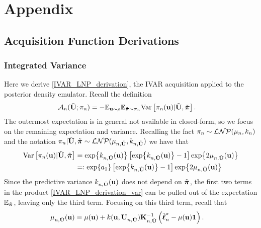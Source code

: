 \documentclass[12pt]{article}
\begin{document}
\section{Appendix}
\subsection{Acquisition Function Derivations}
\subsubsection{Integrated Variance}
Here we derive \ref{IVAR_LNP_derivation}, the IVAR acquisition applied to the posterior density emulator. Recall the definition 
\begin{align}
\acq[\designIdx](\batchMat; \unPostPred) &= -\E_{\bpar \sim \rho} \E_{\tilde{\boldsymbol{\postDens}}  \sim \unPostPred} \Var\left[\unPostPred(\bpar) | \batchMat, \tilde{\boldsymbol{\postDens}} \right].
\end{align}
The outermost expectation is in general not available in closed-form, so we focus on the remaining expectation and variance. Recalling the fact 
$\unPostPred \sim \LNP(\logUnPostMeanPred, \logUnPostKerPred)$ and the notation 
$\unPostPred | \batchMat, \tilde{\boldsymbol{\postDens}} \sim \LNP(\logUnPostMeanPred[\designIdx, \batchMat], \logUnPostKerPred[\designIdx, \batchMat])$
we have that 
\begin{align}
\Var\left[\unPostPred(\bpar) | \batchMat, \tilde{\boldsymbol{\postDens}} \right] &= \Exp{\logUnPostKerPred[\designIdx, \batchMat](\bpar)} \left[\Exp{\logUnPostKerPred[\designIdx, \batchMat](\bpar)} - 1\right] \Exp{2 \logUnPostMeanPred[\designIdx, \batchMat](\bpar)} \label{IVAR_LNP_derivation_var} \\
&=: \Exp{a_1}  \left[\Exp{\logUnPostKerPred[\designIdx, \batchMat](\bpar)} - 1\right] \Exp{2 \logUnPostMeanPred[\designIdx, \batchMat](\bpar)} \nonumber
\end{align}
Since the predictive variance $\logUnPostKerPred[\designIdx, \batchMat](\bpar)$ does not depend on $\tilde{\boldsymbol{\postDens}}$, the first two terms in the 
product \ref{IVAR_LNP_derivation_var} can be pulled out of the expectation $\E_{\tilde{\boldsymbol{\postDens}}}$, leaving only the third term. Focusing on this third term, 
recall that 
\begin{align*}
\logUnPostMeanPred[\designIdx, \batchMat](\bpar) &= \logUnPostMean(\bpar) + \logUnPostKer(\bpar, \designMat[\designIdx, \batchMat]) \KerMat[\designIdx, \batchMat]^{-1} \left(\logUnPostObsBatch - \logUnPostMean(\bpar) \oneVec \right).
\end{align*}
\end{document}
